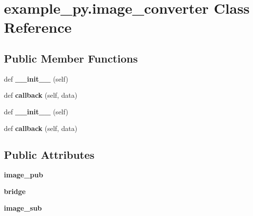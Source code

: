 \hypertarget{classexample__py_1_1image__converter}{}\section{example\+\_\+py.\+image\+\_\+converter Class Reference}
\label{classexample__py_1_1image__converter}
\subsection*{Public Member Functions}
\begin{DoxyCompactItemize}
\item 
\mbox{\label{classexample__py_1_1image__converter_a18ec5d479e99f68fb37eea8b062acd03}} 
def {\bfseries \+\_\+\+\_\+init\+\_\+\+\_\+} (self)
\item 
\mbox{\label{classexample__py_1_1image__converter_a8eb0095c652c0dd58e92dbfa3831bcea}} 
def {\bfseries callback} (self, data)
\item 
\mbox{\label{classexample__py_1_1image__converter_a18ec5d479e99f68fb37eea8b062acd03}} 
def {\bfseries \+\_\+\+\_\+init\+\_\+\+\_\+} (self)
\item 
\mbox{\label{classexample__py_1_1image__converter_a8eb0095c652c0dd58e92dbfa3831bcea}} 
def {\bfseries callback} (self, data)
\end{DoxyCompactItemize}
\subsection*{Public Attributes}
\begin{DoxyCompactItemize}
\item 
\mbox{\label{classexample__py_1_1image__converter_ac69e248a955e409b2b29970e514438cb}} 
{\bfseries image\+\_\+pub}
\item 
\mbox{\label{classexample__py_1_1image__converter_a6b4a18575981a09a02ca641616cb401c}} 
{\bfseries bridge}
\item 
\mbox{\label{classexample__py_1_1image__converter_addefa0b737aab40d26609d1fc95c2f99}} 
{\bfseries image\+\_\+sub}
\end{DoxyCompactItemize}


